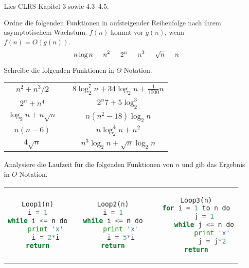 \documentclass{uebung_cs}
\begin{document}
\begin{aufgabe}\label{lesen}
	Lies CLRS Kapitel 3 sowie 4.3--4.5.
\end{aufgabe}

\begin{aufgabe} \label{tue-first}\mbox{}
	Ordne die folgenden Funktionen in aufsteigender Reihenfolge nach ihrem asymptotischem Wachstum.
	$f(n)$ kommt vor $g(n)$, wenn $f(n) = O(g(n))$.
	\[n \log n\hspace*{15pt} n^2\hspace*{15pt} 2^n\hspace*{15pt} n^3\hspace*{15pt} \sqrt{n}\hspace*{15pt} n\]
	
\end{aufgabe}

\begin{aufgabe}
	Schreibe die folgenden Funktionen in $\Theta$-Notation.
	\begin{center}
		\begin{tabular}{ccc}
			$n^2 + n^3/2$
			&\mbox{}\hspace{2cm}\mbox{}&
			$8\log_2^7 n + 34\log_2 n + \frac{1}{1000}n$\\
			$2^n + n^4$&&
			$2^n7 + 5\log_2^3$\\
			$\log_2n + n\sqrt{n}$&&
			$n(n^2 - 18)\log_2 n$\\
			$n(n-6)$&&
			$n\log_2^4 n + n^2$\\
			$4\sqrt{n}$&&
			$n^3 \log_2 n + \sqrt{n}\log_2 n$
		\end{tabular}
	\end{center}
	
\end{aufgabe}

\begin{aufgabe}
	Analysiere die Laufzeit für die folgenden Funktionen von $n$ und gib das Ergebnis in $O$-Notation.
	\begin{center}
		\begin{tabular}{ccccc}

\begin{lstlisting}[language=Python]
Loop1(n)
i = 1
while i <= n do
	print 'x'
	i = 2*i
return
\end{lstlisting}		
		
			&\mbox{}\hspace{2cm}\mbox{}&

\begin{lstlisting}[language=Python]
Loop2(n)
i = 1
while i <= n do
	print 'x'
	i = 5*i
return
\end{lstlisting}

			
			&\mbox{}\hspace{2cm}\mbox{}&
			
\begin{lstlisting}[language=Python]
Loop3(n)
for i = 1 to n do
	j = 1
	while j <= n do
		print 'x'
		j = j*2
return
\end{lstlisting}
		\end{tabular}
	\end{center}
\end{aufgabe}
\end{document}

